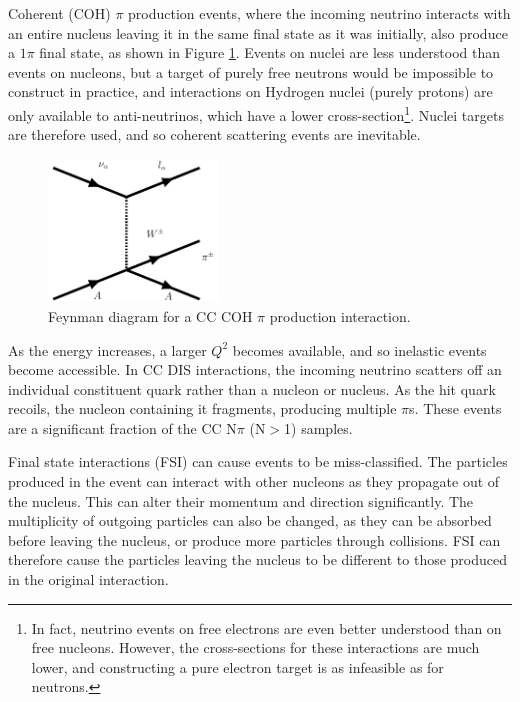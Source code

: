 Coherent (COH) $\pi$ production events, where the incoming neutrino interacts with an entire nucleus leaving it in the same final state as it was initially, also produce a $1\pi$ final state, as shown in Figure \ref{COHdiagram}. Events on nuclei are less understood than events on nucleons, but a target of purely free neutrons would be impossible to construct in practice, and interactions on Hydrogen nuclei (purely protons) are only available to anti-neutrinos, which have a lower cross-section\footnote{In fact, neutrino events on free electrons are even better understood than on free nucleons. However, the cross-sections for these interactions are much lower, and constructing a pure electron target is as infeasible as for neutrons.}. Nuclei targets are therefore used, and so coherent scattering events are inevitable.

\begin{figure}[!htbp]
\vspace{20pt}
\centering
\includegraphics*[width=0.4\textwidth,clip]{figs/feynmanCOH}
\caption{Feynman diagram for a CC COH $\pi$ production interaction. 
} \label{COHdiagram}
\end{figure}

As the energy increases, a larger $Q^2$ becomes available, and so inelastic events become accessible. In CC DIS interactions, the incoming neutrino scatters off an individual constituent quark rather than a nucleon or nucleus. As the hit quark recoils, the nucleon containing it fragments, producing multiple $\pi$s. These events are a significant fraction of the CC N$\pi$ (N$>$1) samples.

Final state interactions (FSI) can cause events to be miss-classified. The particles produced in the event can interact with other nucleons as they propagate out of the nucleus. This can alter their momentum and direction significantly. The multiplicity of outgoing particles can also be changed, as they can be absorbed before leaving the nucleus, or produce more particles through collisions. FSI can therefore cause the particles leaving the nucleus to be different to those produced in the original interaction.

